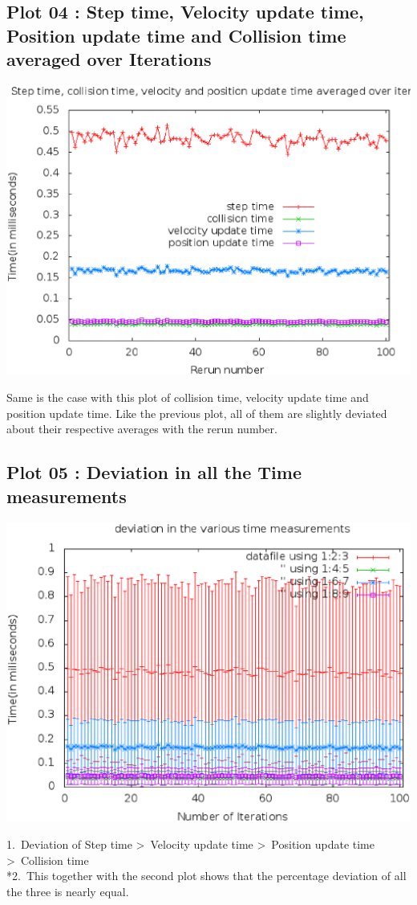 \documentclass[10pt]{article}
\begin{document}
\subsection{Plot 04 : Step time, Velocity update time, Position update time and Collision time averaged over Iterations}
\begin{center}
\includegraphics[scale=0.4]{plot4}
\end{center}
Same is the case with this plot of collision time, velocity update time and position update time. Like the previous plot, all of them are slightly deviated about their respective averages with the rerun number.
\subsection{Plot 05 : Deviation in all the Time measurements}
\begin{center}
\includegraphics[scale=0.4]{plot5}
\end{center}
1.\ Deviation of Step time \textgreater \ Velocity update time \textgreater \ Position update time \textgreater \ Collision time
\\*2.\ This together with the second plot shows that the percentage deviation of all the three is nearly equal.
\end{document}
